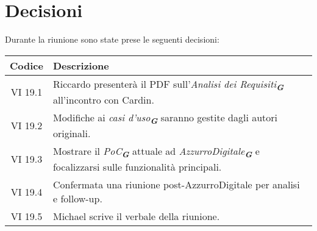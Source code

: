 
\section{Decisioni}

Durante la riunione sono state prese le seguenti decisioni:

\vspace{0.5cm}

\begin{table}[htbp]
    \centering
    \begin{tabular}{|c|p{}|}
        \hline
        \rowcolor[gray]{0.75}
        \textbf{Codice} & \textbf{Descrizione}\\
        \hline
        VI 19.1 & Riccardo presenterà il PDF sull'\emph{Analisi dei Requisiti}\textsubscript{\textit{\textbf{G}}} all’incontro con Cardin.\\
        \hline
        VI 19.2 & Modifiche ai \emph{casi d'uso}\textsubscript{\textit{\textbf{G}}} saranno gestite dagli autori originali.\\
        \hline
        VI 19.3 & Mostrare il \emph{PoC}\textsubscript{\textit{\textbf{G}}} attuale ad \emph{AzzurroDigitale}\textsubscript{\textit{\textbf{G}}} e focalizzarsi sulle funzionalità principali.\\
        \hline
        VI 19.4 & Confermata una riunione post-AzzurroDigitale per analisi e follow-up.\\
        \hline
        VI 19.5 & Michael scrive il verbale della riunione.\\
        \hline
    \end{tabular}
\end{table}

